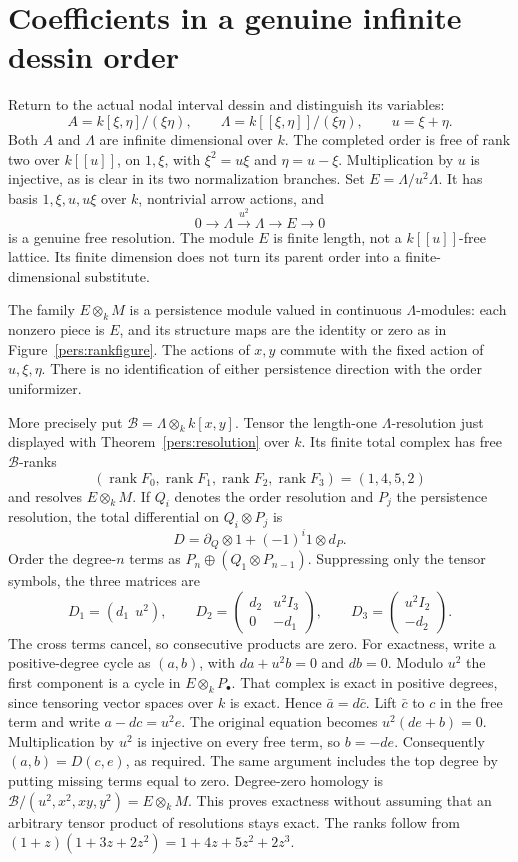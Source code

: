 \documentclass[11pt,oneside,openany]{book}
\theoremstyle{definition}\newtheorem{definition}[theorem]{Definition}
\theoremstyle{remark}\newtheorem{remark}[theorem]{Remark}
\begin{document}
\section{Coefficients in a genuine infinite dessin order}
Return to the actual nodal interval dessin and distinguish its variables:
\[
 A=k[\xi,\eta]/(\xi\eta),\qquad
 \Lambda=k[[\xi,\eta]]/(\xi\eta),\qquad u=\xi+\eta.
\]
Both $A$ and $\Lambda$ are infinite dimensional over $k$.
The completed order is free of rank two over $k[[u]]$, on $1,\xi$,
with $\xi^2=u\xi$ and $\eta=u-\xi$. Multiplication by $u$ is injective,
as is clear in its two normalization branches. Set $E=\Lambda/u^2\Lambda$.
It has basis $1,\xi,u,u\xi$ over $k$, nontrivial arrow actions, and
\[
 0\longrightarrow\Lambda\xrightarrow{u^2}\Lambda\longrightarrow E
       \longrightarrow0
\]
is a genuine free resolution. The module $E$ is finite length, not a
$k[[u]]$-free lattice. Its finite dimension does not turn its parent order
into a finite-dimensional substitute.

The family $E\otimes_k M$ is a persistence module valued in continuous
$\Lambda$-modules: each nonzero piece is $E$, and its structure maps are
the identity or zero as in Figure~\ref{pers:rankfigure}. The actions of
$x,y$ commute with the fixed action of $u,\xi,\eta$. There is no
identification of either persistence direction with the order uniformizer.

More precisely put $\mathcal B=\Lambda\otimes_k k[x,y]$. Tensor the
length-one $\Lambda$-resolution just displayed with
Theorem~\ref{pers:resolution} over $k$. Its finite total complex has
free $\mathcal B$-ranks
\[
 (\operatorname{rank}F_0,\operatorname{rank}F_1,
   \operatorname{rank}F_2,\operatorname{rank}F_3)=(1,4,5,2)
\]
and resolves $E\otimes_k M$. If $Q_i$ denotes the order resolution and
$P_j$ the persistence resolution, the total differential on $Q_i\otimes P_j$
is
\[
 D=\partial_Q\otimes1+(-1)^i1\otimes d_P.
\]
Order the degree-$n$ terms as $P_n\oplus(Q_1\otimes P_{n-1})$.
Suppressing only the tensor symbols, the three matrices are
\[
 D_1=(d_1\ \ u^2),\qquad
 D_2=\begin{pmatrix}d_2&u^2I_3\\0&-d_1\end{pmatrix},\qquad
 D_3=\begin{pmatrix}u^2I_2\\-d_2\end{pmatrix}.
\]
The cross terms cancel, so consecutive products are zero. For exactness,
write a positive-degree cycle as $(a,b)$, with
$d a+u^2b=0$ and $d b=0$. Modulo $u^2$ the first component is a cycle
in $E\otimes_k P_\bullet$. That complex is exact in positive degrees,
since tensoring vector spaces over $k$ is exact. Hence
$\bar a=d\bar c$. Lift $\bar c$ to $c$ in the free term and write
$a-dc=u^2e$. The original equation becomes $u^2(de+b)=0$.
Multiplication by $u^2$ is injective on every free term, so $b=-de$.
Consequently $(a,b)=D(c,e)$, as required. The same argument includes
the top degree by putting missing terms equal to zero. Degree-zero
homology is $\mathcal B/(u^2,x^2,xy,y^2)=E\otimes_k M$.
This proves exactness without assuming that an arbitrary tensor product
of resolutions stays exact. The ranks follow from
$(1+z)(1+3z+2z^2)=1+4z+5z^2+2z^3$.
\end{document}
